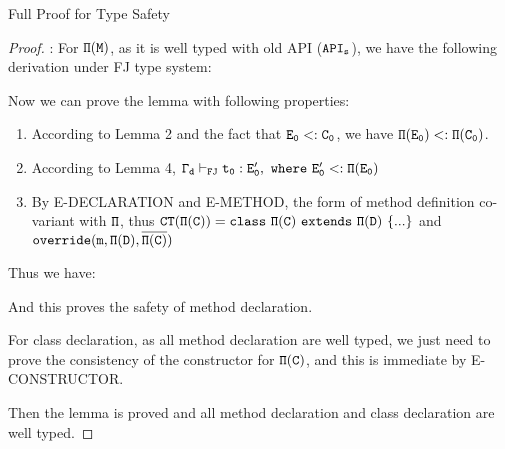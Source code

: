 \begin{section}{Full Proof for Type Safety}
\begin{proof}:
For $\tt\Pi(M)$, as it is well typed with old API ($\tt API_s$), we have the following derivation under FJ type system:
\begin{center}
\noLine
{}
\DP
\end{center}
Now we can prove the lemma with following properties:
\begin{enumerate}
\item According to Lemma 2 and the fact that $\tt E_0<:C_0$, we have $\tt\Pi(E_0)<:\Pi(C_0)$.
\item According to Lemma 4, $\tt\Gamma_d\vdash_{FJ} t_0:E'_0,\ where\ E'_0<:\Pi(E_0)$
\item By E-DECLARATION and E-METHOD, the form of method definition co-variant with $\tt\Pi$, thus $\tt CT(\Pi(C))=class\ \Pi(C)\ extends\ \Pi(D)\ \{...\}$ and $\tt override(m,\Pi(D),\overline{\Pi(C)})$
\end{enumerate}
Thus we have:
\begin{center}
\noLine
{}
\noLine
{}
\DP
\end{center}
And this proves the safety of method declaration.
\par
For class declaration, as all method declaration are well typed, we just need to prove the consistency of the constructor for $\tt\Pi(C)$, and this is immediate by E-CONSTRUCTOR.
\par
Then the lemma is proved and all method declaration and class declaration are well typed.
\end{proof}

\end{section}
